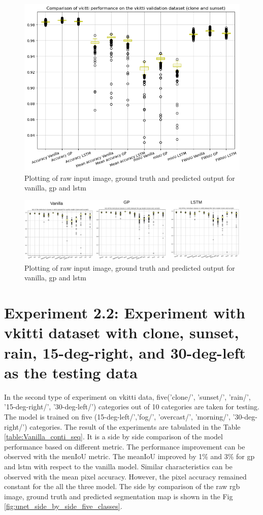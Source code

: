 	\begin{figure}
		\centering
		\includegraphics[width=12cm]{images/vkitti_validation_data_two_class_box_plot.png}
		\caption{Plotting of raw input image, ground truth and predicted output for vanilla, gp and lstm}
		\label{fig:performance_metric_vkitti_two_class_box_plot}
	\end{figure}
	
	\begin{figure}
		\centering
		\includegraphics[width=19cm]{images/IoU_two.png}
		\caption{Plotting of raw input image, ground truth and predicted output for vanilla, gp and lstm}
		\label{fig:performance_metric_three_classes}
	\end{figure}

	\section{Experiment 2.2: Experiment with vkitti dataset with clone, sunset, rain, 15-deg-right, and 30-deg-left as the testing data}
	
	In the second type of experiment on vkitti data, five('clone/', 'sunset/', 'rain/', '15-deg-right/',
	'30-deg-left/') categories out of 10 categories are taken for testing. The model is trained on five (15-deg-left/','fog/', 'overcast/', 'morning/', '30-deg-right/') categories. The result of the experiments are tabulated in the Table \ref{table:Vanilla_conti_seq}. It is a side by side comparison of the model performance based on different metric. The performance improvement can be observed with the menIoU metric. The meanIoU improved by 1\% and 3\% for gp and lstm with respect to the vanilla model. Similar characteristics can be observed with the mean pixel accuracy. However, the pixel accuracy remained constant for the all the three model. The side by comparison of the raw rgb image, ground truth and predicted segmentation map is shown in the Fig \ref{fig:unet_side_by_side_five_classes}. 
	
